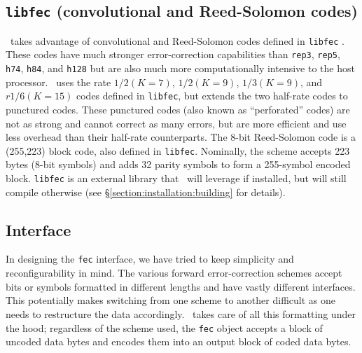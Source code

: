 \subsection{{\tt libfec} (convolutional and  Reed-Solomon codes)}
\label{module:fec:libfecv}
\liquid\ takes advantage of convolutional and Reed-Solomon codes defined in
{\tt libfec} \cite{libfec:web}.
These codes have much stronger error-correction capabilities than {\tt rep3},
{\tt rep5}, {\tt h74}, {\tt h84}, and {\tt h128}
but are also much more computationally intensive to the host processor.
\liquid\ uses the rate $1/2 (K=7)$, $1/2 (K=9)$, $1/3 (K=9)$, and
$r1/6 (K=15)$ codes defined in {\tt libfec}, but extends the two half-rate
codes to punctured codes.
These punctured codes (also known as ``perforated'' codes) are not as strong
and cannot correct as many errors, but are more efficient and use less
overhead than their half-rate counterparts.
%
The 8-bit Reed-Solomon code is a (255,223) block code, also defined in
{\tt libfec}.
Nominally, the scheme accepts 223 bytes (8-bit symbols) and adds 32 parity
symbols to form a 255-symbol encoded block.
%
{\tt libfec} is an external library that \liquid\ will leverage if
installed, but will still compile otherwise
(see \S\ref{section:installation:building} for details).

\subsection{Interface}
\label{module:fec:interface}
In designing the {\tt fec} interface, we have tried to keep simplicity and
reconfigurability in mind.
The various forward error-correction schemes accept bits or symbols
formatted in different lengths and have vastly different interfaces.
This potentially makes switching from one scheme to another difficult as one
needs to restructure the data accordingly.
\liquid\ takes care of all this formatting under the hood; regardless of the
scheme used, the {\tt fec} object accepts a block of uncoded data bytes and
encodes them into an output block of coded data bytes.


